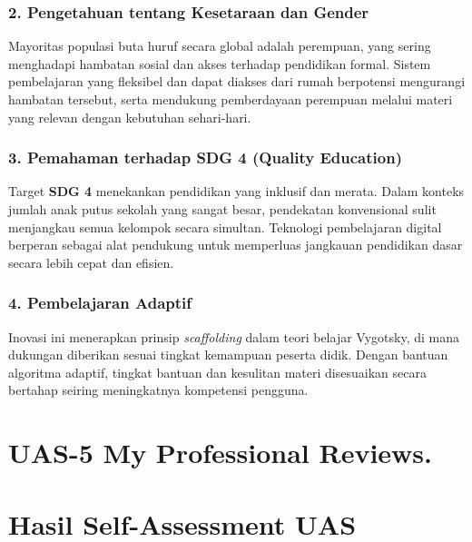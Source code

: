 \documentclass[
  letterpaper,
  DIV=11,
  numbers=noendperiod]{scrreprt}
\begin{document}
\subsection{2. Pengetahuan tentang Kesetaraan dan
Gender}\label{pengetahuan-tentang-kesetaraan-dan-gender}

Mayoritas populasi buta huruf secara global adalah perempuan, yang
sering menghadapi hambatan sosial dan akses terhadap pendidikan formal.
Sistem pembelajaran yang fleksibel dan dapat diakses dari rumah
berpotensi mengurangi hambatan tersebut, serta mendukung pemberdayaan
perempuan melalui materi yang relevan dengan kebutuhan sehari-hari.

\subsection{3. Pemahaman terhadap SDG 4 (Quality
Education)}\label{pemahaman-terhadap-sdg-4-quality-education}

Target \textbf{SDG 4} menekankan pendidikan yang inklusif dan merata.
Dalam konteks jumlah anak putus sekolah yang sangat besar, pendekatan
konvensional sulit menjangkau semua kelompok secara simultan. Teknologi
pembelajaran digital berperan sebagai alat pendukung untuk memperluas
jangkauan pendidikan dasar secara lebih cepat dan efisien.

\subsection{4. Pembelajaran Adaptif}\label{pembelajaran-adaptif}

Inovasi ini menerapkan prinsip \emph{scaffolding} dalam teori belajar
Vygotsky, di mana dukungan diberikan sesuai tingkat kemampuan peserta
didik. Dengan bantuan algoritma adaptif, tingkat bantuan dan kesulitan
materi disesuaikan secara bertahap seiring meningkatnya kompetensi
pengguna.


\chapter{UAS-5 My Professional
Reviews.}\label{uas-5-my-professional-reviews.}


\chapter{Hasil Self-Assessment UAS}\label{hasil-self-assessment-uas}
\end{document}
